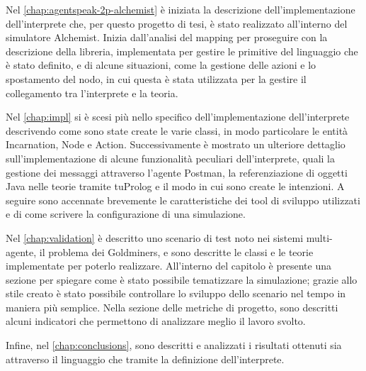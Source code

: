 Nel \cref{chap:agentspeak-2p-alchemist} è iniziata la descrizione dell'implementazione dell'interprete che, per questo progetto di tesi, è stato realizzato all'interno del simulatore Alchemist.
Inizia dall'analisi del mapping per proseguire con la descrizione della libreria, implementata per gestire le primitive del linguaggio che è stato definito, e di alcune situazioni, come la gestione delle azioni e lo spostamento del nodo, in cui questa è stata utilizzata per la gestire il collegamento tra l'interprete e la teoria.

Nel \cref{chap:impl} si è scesi più nello specifico dell'implementazione dell'interprete descrivendo come sono state create le varie classi, in modo particolare le entità Incarnation, Node e Action.
Successivamente è mostrato un ulteriore dettaglio sull'implementazione di alcune funzionalità peculiari dell'interprete, quali la gestione dei messaggi attraverso l'agente Postman, la referenziazione di oggetti Java nelle teorie tramite tuProlog e il modo in cui sono create le intenzioni.
A seguire sono accennate brevemente le caratteristiche dei tool di sviluppo utilizzati e di come scrivere la configurazione di una simulazione.

Nel \cref{chap:validation} è descritto uno scenario di test noto nei sistemi multi-agente, il problema dei Goldminers, e sono descritte le classi e le teorie implementate per poterlo realizzare.
All'interno del capitolo è presente una sezione per spiegare come è stato possibile tematizzare la simulazione; grazie allo stile creato è stato possibile controllare lo sviluppo dello scenario nel tempo in maniera più semplice.
Nella sezione delle metriche di progetto, sono descritti alcuni indicatori che permettono di analizzare meglio il lavoro svolto.

Infine, nel \cref{chap:conclusions}, sono descritti e analizzati i risultati ottenuti sia attraverso il linguaggio che tramite la definizione dell'interprete.